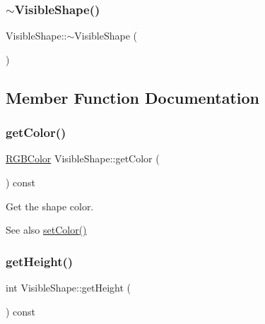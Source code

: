 \subsubsection{\texorpdfstring{$\sim$\+Visible\+Shape()}{~VisibleShape()}}
{\footnotesize\ttfamily Visible\+Shape\+::$\sim$\+Visible\+Shape (\begin{DoxyParamCaption}{ }\end{DoxyParamCaption})\hspace{0.3cm}{\ttfamily [virtual]}}



\subsection{Member Function Documentation}
\mbox{\label{class_visible_shape_a80fe773d65776d9402be26068564882d}} 
\subsubsection{\texorpdfstring{get\+Color()}{getColor()}}
{\footnotesize\ttfamily \mbox{\hyperlink{class_r_g_b_color}{R\+G\+B\+Color}} Visible\+Shape\+::get\+Color (\begin{DoxyParamCaption}{ }\end{DoxyParamCaption}) const\hspace{0.3cm}{\ttfamily [virtual]}}



Get the shape color. 

\begin{DoxySeeAlso}{See also}
\mbox{\hyperlink{class_visible_shape_a69ae0940d090fec376bee8dc6861b8dc}{set\+Color()}} 
\end{DoxySeeAlso}
\mbox{\label{class_visible_shape_a1ce25935c729146932d649f88215ffbe}} 
\subsubsection{\texorpdfstring{get\+Height()}{getHeight()}}
{\footnotesize\ttfamily int Visible\+Shape\+::get\+Height (\begin{DoxyParamCaption}{ }\end{DoxyParamCaption}) const\hspace{0.3cm}{\ttfamily [virtual]}}



